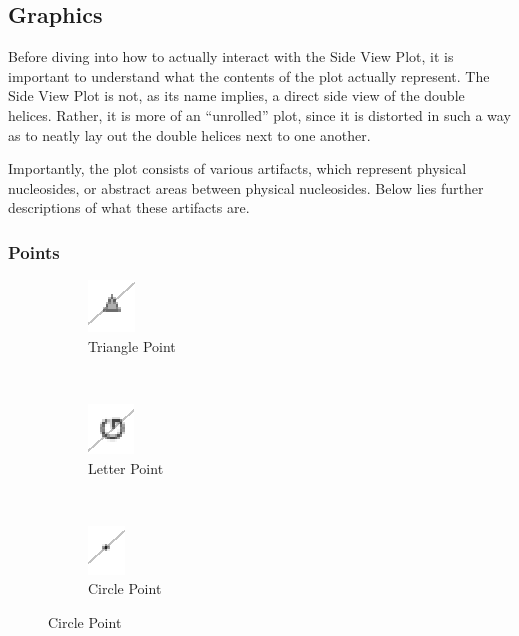 \documentclass[titlepage]{article}
\begin{document}
	\subsection{Graphics}
	Before diving into how to actually interact with the Side View Plot, it is important to understand what the contents of the plot actually represent. The Side View Plot is not, as its name implies, a direct side view of the double helices. Rather, it is more of an “unrolled” plot, since it is distorted in such a way as to neatly lay out the double helices next to one another.
	
	Importantly, the plot consists of various artifacts, which represent physical nucleosides, or abstract areas between physical nucleosides. Below lies further descriptions of what these artifacts are.
	
	\subsubsection{Points}
	
	\begin{figure}[h]
		\centering
		\caption{Side View Plot Point Graphics}
		\label{fig:side-view-plot-point-graphics}
		
		\begin{subfigure}{.3\linewidth}
			\centering
			\includegraphics[width=.3in]{up-triangle.png}
			\caption{Triangle Point}
			\label{fig:up-triangle}
		\end{subfigure}%
 		~
		\begin{subfigure}{.3\linewidth}
			\centering
			\includegraphics[width=.3in]{base-symbol.png}
			\caption{Letter Point}
			\label{fig:base-symbol}
		\end{subfigure}%
		~
		\begin{subfigure}{.3\linewidth}
			\centering
			\includegraphics[width=.3in]{nondominant-point.png}
			\caption{Circle Point}
			\label{fig:nondominant-point}
		\end{subfigure}
	\end{figure}
\end{document}

